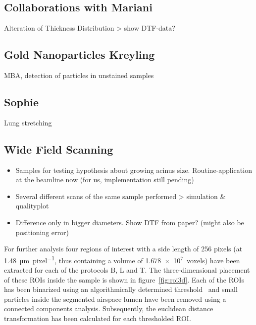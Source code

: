 \documentclass[a4paper,twoside,english,DIV=calc]{scrartcl}
\begin{document}
\subsection{Collaborations with Mariani}
Alteration of Thickness Distribution > show DTF-data?

\subsection{Gold Nanoparticles Kreyling}
MBA, detection of particles in unstained samples

\subsection{Sophie}
Lung stretching

\subsection{Wide Field Scanning}
\begin{itemize}
\item Samples for testing hypothesis about growing acinus size. Routine-application at the beamline now (for us, implementation still pending)
\item Several different scans of the same sample performed > simulation \& qualityplot
\item Difference only in bigger diameters. Show DTF from paper? (might also be positioning error)
\end{itemize}

For further analysis four regions of interest with a side length of 256 pixels (at \SI{1.48}{\micro\meter\per pixel}, thus containing a volume of \SI{1.678e7}{voxels}) have been extracted for each of the protocols B, L and T. The three-dimensional placement of these ROIs inside the sample is shown in figure~\ref{fig:roi3d}. Each of the ROIs has been binarized using an algorithmically determined threshold~\cite{Otsu1979} and small particles inside the segmented airspace lumen have been removed using a connected components analysis. Subsequently, the euclidean distance transformation has been calculated for each thresholded ROI.
\end{document}
